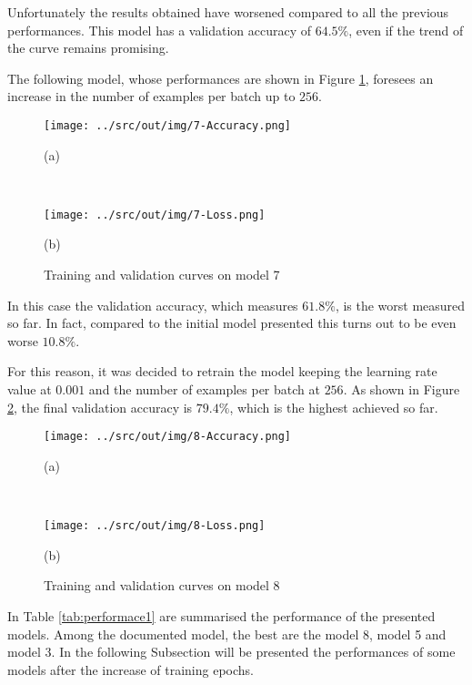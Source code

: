 \documentclass[a4paper,12pt]{article} %
\begin{document}
	Unfortunately the results obtained have worsened compared to all the 
	previous performances. This model has a validation accuracy of $64.5\%$, 
	even if the trend of the curve remains promising.
	\newline
	
	The following model, whose performances are shown in Figure 
	\ref{fig:model7-performance}, foresees an increase in the number of 
	examples per batch up to $256$.
	
	\begin{figure}[H]
		\begin{minipage}[c]{.49\textwidth}
			\centering
			\texttt{[image: ../src/out/img/7-Accuracy.png]}
			\caption*{(a)}
		\end{minipage}
		~
		\begin{minipage}[c]{.49\textwidth}
			\centering
			\texttt{[image: ../src/out/img/7-Loss.png]}
			\caption*{(b)}
		\end{minipage}
		\caption{Training and validation curves on model 7}
		\label{fig:model7-performance}
	\end{figure}
	In this case the validation accuracy, which measures $61.8\%$, is the worst 
	measured so far. In fact, compared to the initial model presented this 
	turns out to be even worse $10.8\%$. 
	\newline
	
	For this reason, it was decided to retrain the model keeping the learning 
	rate value at $0.001$ and the number of examples per batch at $256$.
	As shown in Figure \ref{fig:model8-performance}, the final validation 
	accuracy is $79.4\%$, which is the highest achieved so far.
	
	\begin{figure}[htb]
		\begin{minipage}[c]{.49\textwidth}
			\centering
			\texttt{[image: ../src/out/img/8-Accuracy.png]}
			\caption*{(a)}
		\end{minipage}
		~
		\begin{minipage}[c]{.49\textwidth}
			\centering
			\texttt{[image: ../src/out/img/8-Loss.png]}
			\caption*{(b)}
		\end{minipage}
		\caption{Training and validation curves on model 8}
		\label{fig:model8-performance}
	\end{figure}

	In Table \ref{tab:performace1} are summarised the performance of the 
	presented models. Among the documented model, the best are the model 8, 
	model 5 and model 3. 
	In the following Subsection will be presented the performances of some 
	models after the increase of training epochs.
	
\end{document}

